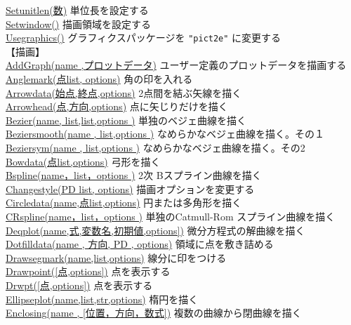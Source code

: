 \documentclass[papersize,a4paper,12pt,uplatex]{jsarticle}
\begin{document}
\begin{tabbing}
\hyperlink{setunitlen}{Setunitlen(数)}    \>単位長を設定する\\
\hyperlink{setwindow}{Setwindow()}  \>描画領域を設定する\\
\hyperlink{usegraphics}{Usegraphics()} \>グラフィクスパッケージを  \verb|"pict2e"| に変更する\\
【描画】\\
\hyperlink{addgraph}{AddGraph(name ,プロットデータ)} \>ユーザー定義のプロットデータを描画する\\
\hyperlink{anglemark}{Anglemark(点list, options)}  \>角の印を入れる\\
\hyperlink{arrowdata}{Arrowdata(始点,終点,options)}  \>2点間を結ぶ矢線を描く\\
\hyperlink{arrowhead}{Arrowhead(点,方向,options)}  \>点に矢じりだけを描く\\
\hyperlink{bezier}{Bezier(name, list,list,options )} \>単独のベジェ曲線を描く\\
\hyperlink{beziersmooth}{Beziersmooth(name , list,options )} \>なめらかなベジェ曲線を描く。その１\\
\hyperlink{beziersym}{Beziersym(name , list,options )} \>なめらかなベジェ曲線を描く。その2\\
\hyperlink{bowdata}{Bowdata(点list,options)}  \>弓形を描く\\
\hyperlink{bspline}{Bspline(name，list，options )}   \>2次 Bスプライン曲線を描く\\
\hyperlink{changestyle}{Changestyle(PD list, options)} \>描画オプションを変更する\\
\hyperlink{circledata}{Circledata(name,点list,options)}  \>円または多角形を描く\\
\hyperlink{crspline}{CRspline(name，list，options )} \>単独のCatmull-Rom スプライン曲線を描く\\
\hyperlink{deqplot}{Deqplot(name,式,変数名,初期値,options])}  \>微分方程式の解曲線を描く\\
\hyperlink{dotfilldata}{Dotfilldata(name , 方向, PD , options)}    \>領域に点を敷き詰める\\
\hyperlink{drawsegmark}{Drawsegmark(name,list,options)}  \>線分に印をつける\\
\hyperlink{drwpt}{Drawpoint([点,options])}  \>点を表示する\\
\hyperlink{drwpt}{Drwpt([点,options])}      \>点を表示する\\
\hyperlink{ellipseplot}{Ellipseplot(name,list,str,options)}  \>楕円を描く\\
\hyperlink{enclosing}{Enclosing(name , [位置，方向，数式])}  \>複数の曲線から閉曲線を描く\\

\end{tabbing}
\end{document}
